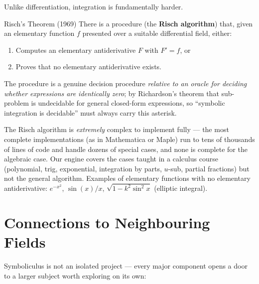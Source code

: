 \documentclass[12pt, openany]{book}
\theoremstyle{plain}
\theoremstyle{definition}
\theoremstyle{remark}
\begin{document}
Unlike differentiation, integration is fundamentally harder.

\begin{thmbox}{Risch's Theorem (1969)}
There is a procedure (the \textbf{Risch algorithm}) that, given an elementary
function $f$ presented over a suitable differential field, either:
\begin{enumerate}[noitemsep]
  \item Computes an elementary antiderivative $F$ with $F'=f$, or
  \item Proves that no elementary antiderivative exists.
\end{enumerate}
The procedure is a genuine decision procedure \emph{relative to an oracle for
deciding whether expressions are identically zero}; by Richardson's theorem
that sub-problem is undecidable for general closed-form expressions, so
``symbolic integration is decidable'' must always carry this asterisk.
\end{thmbox}
\color{black}

\begin{remarkbox}
The Risch algorithm is \emph{extremely} complex
to implement fully --- the most complete implementations (as in Mathematica or Maple) run
to tens of thousands of lines of code and handle dozens of special cases, and none
is complete for the algebraic case.  Our engine
covers the cases taught in a calculus course (polynomial, trig, exponential,
integration by parts, $u$-sub, partial fractions) but not the general algorithm.
Examples of elementary functions with no elementary antiderivative:
$e^{-x^2}$, $\sin(x)/x$, $\sqrt{1-k^2\sin^2 x}$ (elliptic integral).
\end{remarkbox}
\color{black}

\section{Connections to Neighbouring Fields}

Symboliculus is not an isolated project --- every major component opens a door
to a larger subject worth exploring on its own:
\end{document}
